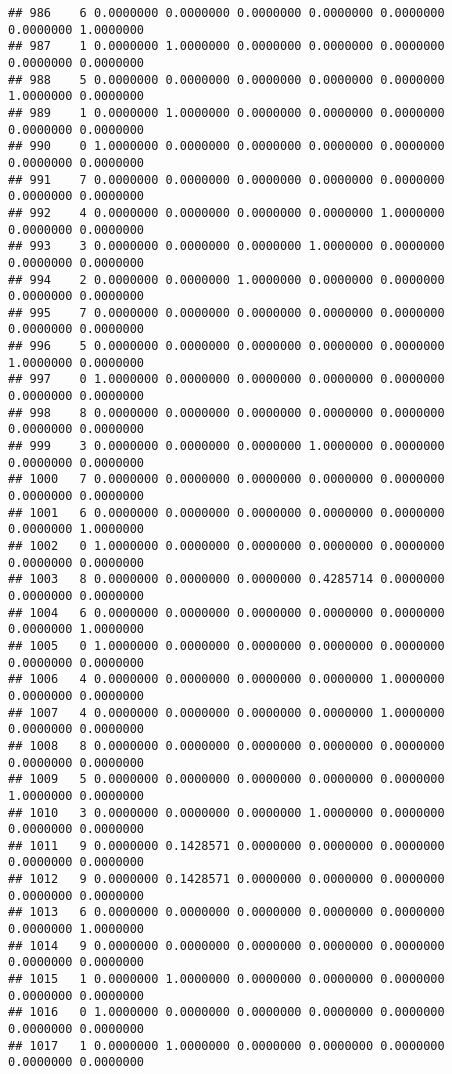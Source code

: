\documentclass[
]{article}
\begin{document}
\begin{verbatim}
## 986    6 0.0000000 0.0000000 0.0000000 0.0000000 0.0000000 0.0000000 1.0000000
## 987    1 0.0000000 1.0000000 0.0000000 0.0000000 0.0000000 0.0000000 0.0000000
## 988    5 0.0000000 0.0000000 0.0000000 0.0000000 0.0000000 1.0000000 0.0000000
## 989    1 0.0000000 1.0000000 0.0000000 0.0000000 0.0000000 0.0000000 0.0000000
## 990    0 1.0000000 0.0000000 0.0000000 0.0000000 0.0000000 0.0000000 0.0000000
## 991    7 0.0000000 0.0000000 0.0000000 0.0000000 0.0000000 0.0000000 0.0000000
## 992    4 0.0000000 0.0000000 0.0000000 0.0000000 1.0000000 0.0000000 0.0000000
## 993    3 0.0000000 0.0000000 0.0000000 1.0000000 0.0000000 0.0000000 0.0000000
## 994    2 0.0000000 0.0000000 1.0000000 0.0000000 0.0000000 0.0000000 0.0000000
## 995    7 0.0000000 0.0000000 0.0000000 0.0000000 0.0000000 0.0000000 0.0000000
## 996    5 0.0000000 0.0000000 0.0000000 0.0000000 0.0000000 1.0000000 0.0000000
## 997    0 1.0000000 0.0000000 0.0000000 0.0000000 0.0000000 0.0000000 0.0000000
## 998    8 0.0000000 0.0000000 0.0000000 0.0000000 0.0000000 0.0000000 0.0000000
## 999    3 0.0000000 0.0000000 0.0000000 1.0000000 0.0000000 0.0000000 0.0000000
## 1000   7 0.0000000 0.0000000 0.0000000 0.0000000 0.0000000 0.0000000 0.0000000
## 1001   6 0.0000000 0.0000000 0.0000000 0.0000000 0.0000000 0.0000000 1.0000000
## 1002   0 1.0000000 0.0000000 0.0000000 0.0000000 0.0000000 0.0000000 0.0000000
## 1003   8 0.0000000 0.0000000 0.0000000 0.4285714 0.0000000 0.0000000 0.0000000
## 1004   6 0.0000000 0.0000000 0.0000000 0.0000000 0.0000000 0.0000000 1.0000000
## 1005   0 1.0000000 0.0000000 0.0000000 0.0000000 0.0000000 0.0000000 0.0000000
## 1006   4 0.0000000 0.0000000 0.0000000 0.0000000 1.0000000 0.0000000 0.0000000
## 1007   4 0.0000000 0.0000000 0.0000000 0.0000000 1.0000000 0.0000000 0.0000000
## 1008   8 0.0000000 0.0000000 0.0000000 0.0000000 0.0000000 0.0000000 0.0000000
## 1009   5 0.0000000 0.0000000 0.0000000 0.0000000 0.0000000 1.0000000 0.0000000
## 1010   3 0.0000000 0.0000000 0.0000000 1.0000000 0.0000000 0.0000000 0.0000000
## 1011   9 0.0000000 0.1428571 0.0000000 0.0000000 0.0000000 0.0000000 0.0000000
## 1012   9 0.0000000 0.1428571 0.0000000 0.0000000 0.0000000 0.0000000 0.0000000
## 1013   6 0.0000000 0.0000000 0.0000000 0.0000000 0.0000000 0.0000000 1.0000000
## 1014   9 0.0000000 0.0000000 0.0000000 0.0000000 0.0000000 0.0000000 0.0000000
## 1015   1 0.0000000 1.0000000 0.0000000 0.0000000 0.0000000 0.0000000 0.0000000
## 1016   0 1.0000000 0.0000000 0.0000000 0.0000000 0.0000000 0.0000000 0.0000000
## 1017   1 0.0000000 1.0000000 0.0000000 0.0000000 0.0000000 0.0000000 0.0000000

\end{verbatim}
\end{document}
